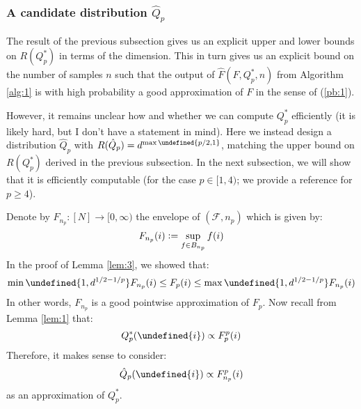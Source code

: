 \documentclass{article}
\theoremstyle{plain}
\theoremstyle{definition}
\theoremstyle{remark}
\newcommand{\defeq}{\vcentcolon=}
\let\brace\undefined
\DeclarePairedDelimiter{\brace}{\lbrace}{\rbrace}
\begin{document}
\subsubsection{A candidate distribution $\hat{Q}_p$}
The result of the previous subsection gives us an explicit upper and lower bounds on $R(Q^{*}_p)$ in terms of the dimension. This in turn gives us an explicit bound on the number of samples $n$ such that the output of $\widehat{F}(F, Q_p^{*}, n)$ from Algorithm \ref{alg:1} is with high probability a good approximation of $F$ in the sense of (\ref{pb:1}).

However, it remains unclear how and whether we can compute $Q^{*}_p$ efficiently (it is likely hard,  but I don't have a statement in mind). Here we instead design a distribution $\hat{Q}_p$ with $R(\hat{Q}_p) = d^{\max{\brace{p/2, 1}}}$, matching the upper bound on $R(Q_p^{*})$ derived in the previous subsection. In the next subsection, we will show that it is efficiently computable (for the case $p \in [1,4)$; we provide a reference for $p \geq 4$).

Denote by $F_{n_p}: [N] \to [0, \infty)$ the envelope of $(\mathcal{F}, n_p)$ which is given by:
\begin{equation*}
    F_{n_p}(i) \defeq \sup_{f \in B_{n_p}} f(i)
\end{equation*}
In the proof of Lemma \ref{lem:3}, we showed that:
\begin{equation*}
    \min{\brace{1, d^{1/2 - 1/p}}} F_{n_p}(i) \leq F_{p}(i) \leq \max{\brace{1, d^{1/2 - 1/p}}} F_{n_p}(i)
\end{equation*}
In other words, $F_{n_p}$ is a good pointwise approximation of $F_p$. Now recall from Lemma \ref{lem:1} that:
\begin{equation*}
    Q_p^{*}(\brace{i}) \propto F_{p}^p(i)
\end{equation*}
Therefore, it makes sense to consider:
\begin{equation*}
    \hat{Q}_{p}(\brace{i}) \propto F_{n_p}^{p}(i)
\end{equation*}
as an approximation of $Q_p^{*}$.
\end{document}
